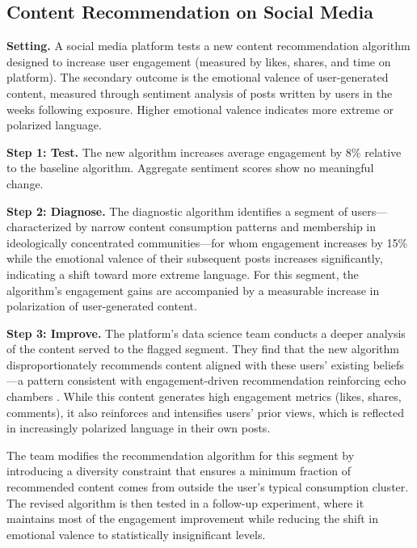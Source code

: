 \documentclass[11pt,letterpaper,english]{article}
\theoremstyle{definition}
\theoremstyle{definition}
\begin{document}
\begin{bibunit}
\subsection{Content Recommendation on Social Media}
\label{sec:app-content}

\noindent
\textbf{Setting.} A social media platform tests a new content recommendation algorithm designed to increase user engagement (measured by likes, shares, and time on platform). The secondary outcome is the emotional valence of user-generated content, measured through sentiment analysis of posts written by users in the weeks following exposure. Higher emotional valence indicates more extreme or polarized language.

\vspace{4pt}
\noindent
\textbf{Step 1: Test.}
The new algorithm increases average engagement by 8\% relative to the baseline algorithm. Aggregate sentiment scores show no meaningful change.

\vspace{4pt}
\noindent
\textbf{Step 2: Diagnose.}
The diagnostic algorithm identifies a segment of users---characterized by narrow content consumption patterns and membership in ideologically concentrated communities---for whom engagement increases by 15\% while the emotional valence of their subsequent posts increases significantly, indicating a shift toward more extreme language. For this segment, the algorithm's engagement gains are accompanied by a measurable increase in polarization of user-generated content.

\vspace{4pt}
\noindent
\textbf{Step 3: Improve.}
The platform's data science team conducts a deeper analysis of the content served to the flagged segment. They find that the new algorithm disproportionately recommends content aligned with these users' existing beliefs---a pattern consistent with engagement-driven recommendation reinforcing echo chambers \citep{guess2023social}. While this content generates high engagement metrics (likes, shares, comments), it also reinforces and intensifies users' prior views, which is reflected in increasingly polarized language in their own posts.

The team modifies the recommendation algorithm for this segment by introducing a diversity constraint that ensures a minimum fraction of recommended content comes from outside the user's typical consumption cluster. The revised algorithm is then tested in a follow-up experiment, where it maintains most of the engagement improvement while reducing the shift in emotional valence to statistically insignificant levels.


\end{bibunit}
\end{document}

